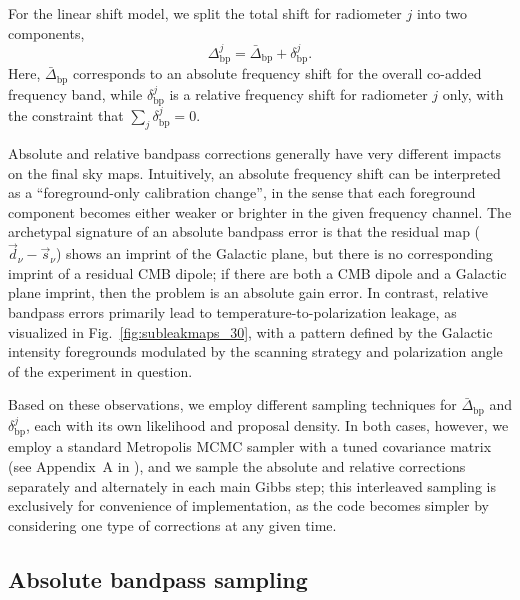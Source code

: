 \documentclass[twocolumn]{aa}
\renewcommand{\d}[0]{\vec{d}}
\newcommand{\s}[0]{\vec{s}}
\newcommand{\?}[1]{\textcolor{red}{{\bf [#1]}}}
\begin{document}
For the linear shift model, we split the total shift for radiometer
$j$ into two components,
\begin{equation} 
  \Delta_{\mathrm{bp}}^j = \bar{\Delta}_{\mathrm{bp}} + \delta_{\mathrm{bp}}^j.
  \label{eq:correction}
\end{equation}
Here, $\bar{\Delta}_{\mathrm{bp}}$ corresponds to an absolute
frequency shift for the overall co-added frequency band, while
$\delta_{\mathrm{bp}}^j$ is a relative frequency shift for radiometer
$j$ only, with the constraint that $\sum_j\delta_{\mathrm{bp}}^j = 0$.

Absolute and relative bandpass corrections generally have very
different impacts on the final sky maps. Intuitively, an absolute
frequency shift can be interpreted as a ``foreground-only calibration
change'', in the sense that each foreground component becomes either
weaker or brighter in the given frequency channel. The archetypal
signature of an absolute bandpass error is that the residual map
($\d_{\nu}-\s_{\nu}$) shows an imprint of the Galactic plane, but
there is no corresponding imprint of a residual CMB dipole; if there
are both a CMB dipole and a Galactic plane imprint, then the problem
is an absolute gain error. In contrast, relative bandpass errors
primarily lead to temperature-to-polarization leakage, as visualized
in Fig.~\ref{fig:subleakmaps_30}, with a pattern defined by the
Galactic intensity foregrounds modulated by the scanning strategy and
polarization angle of the experiment in question.

Based on these observations, we employ different sampling techniques for
$\bar{\Delta}_{\mathrm{bp}}$ and $\delta_{\mathrm{bp}}^j$, each with its own
likelihood and proposal density. In both cases, however, we employ a standard
Metropolis MCMC sampler with a tuned covariance matrix (see Appendix~A in
\citealp{bp01}), and we sample the absolute and relative corrections separately
and alternately in each main Gibbs step; this interleaved sampling is
exclusively for convenience of implementation, as the code becomes simpler by
considering one type of corrections at any given time.


\subsection{Absolute bandpass sampling}
\end{document}
